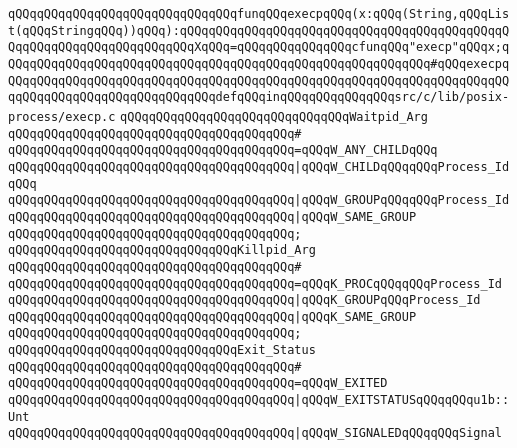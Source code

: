 \verb|qQQqqQQqqQQqqQQqqQQqqQQqqQQqqQQqfunqQQqexecpqQQq(x:qQQq(String,qQQqList(qQQqStringqQQq))qQQq):qQQqqQQqqQQqqQQqqQQqqQQqqQQqqQQqqQQqqQQqqQQqqQQqqQQqqQQqqQQqqQQqqQQqqQQqXqQQq=qQQqqQQqqQQqqQQqcfunqQQq"execp"qQQqx;qQQqqQQqqQQqqQQqqQQqqQQqqQQqqQQqqQQqqQQqqQQqqQQqqQQqqQQqqQQq#qQQqexecpqQQqqQQqqQQqqQQqqQQqqQQqqQQqqQQqqQQqqQQqqQQqqQQqqQQqqQQqqQQqqQQqqQQqqQQqqQQqqQQqqQQqqQQqqQQqqQQqqQQqdefqQQqinqQQqqQQqqQQqqQQqsrc/c/lib/posix-process/execp.c|\newline
\newline
\verb|qQQqqQQqqQQqqQQqqQQqqQQqqQQqqQQqWaitpid_Arg|\newline
\verb|qQQqqQQqqQQqqQQqqQQqqQQqqQQqqQQqqQQqqQQq#|\newline
\verb|qQQqqQQqqQQqqQQqqQQqqQQqqQQqqQQqqQQqqQQq=qQQqW_ANY_CHILDqQQq|\newline
\verb|qQQqqQQqqQQqqQQqqQQqqQQqqQQqqQQqqQQqqQQq|\verb#|qQQqW_CHILDqQQqqQQqProcess_IdqQQq#\newline
\verb|qQQqqQQqqQQqqQQqqQQqqQQqqQQqqQQqqQQqqQQq|\verb#|qQQqW_GROUPqQQqqQQqProcess_Id#\newline
\verb|qQQqqQQqqQQqqQQqqQQqqQQqqQQqqQQqqQQqqQQq|\verb#|qQQqW_SAME_GROUP#\newline
\verb|qQQqqQQqqQQqqQQqqQQqqQQqqQQqqQQqqQQqqQQq;|\newline
\newline
\verb|qQQqqQQqqQQqqQQqqQQqqQQqqQQqqQQqKillpid_Arg|\newline
\verb|qQQqqQQqqQQqqQQqqQQqqQQqqQQqqQQqqQQqqQQq#|\newline
\verb|qQQqqQQqqQQqqQQqqQQqqQQqqQQqqQQqqQQqqQQq=qQQqK_PROCqQQqqQQqProcess_Id|\newline
\verb|qQQqqQQqqQQqqQQqqQQqqQQqqQQqqQQqqQQqqQQq|\verb#|qQQqK_GROUPqQQqProcess_Id#\newline
\verb|qQQqqQQqqQQqqQQqqQQqqQQqqQQqqQQqqQQqqQQq|\verb#|qQQqK_SAME_GROUP#\newline
\verb|qQQqqQQqqQQqqQQqqQQqqQQqqQQqqQQqqQQqqQQq;|\newline
\newline
\verb|qQQqqQQqqQQqqQQqqQQqqQQqqQQqqQQqExit_Status|\newline
\verb|qQQqqQQqqQQqqQQqqQQqqQQqqQQqqQQqqQQqqQQq#|\newline
\verb|qQQqqQQqqQQqqQQqqQQqqQQqqQQqqQQqqQQqqQQq=qQQqW_EXITED|\newline
\verb|qQQqqQQqqQQqqQQqqQQqqQQqqQQqqQQqqQQqqQQq|\verb#|qQQqW_EXITSTATUSqQQqqQQqu1b::Unt#\newline
\verb|qQQqqQQqqQQqqQQqqQQqqQQqqQQqqQQqqQQqqQQq|\verb#|qQQqW_SIGNALEDqQQqqQQqSignal#\newline
